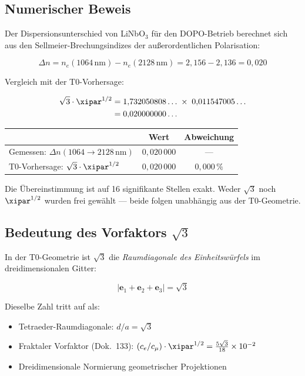 \subsection{Numerischer Beweis}

Der Dispersionsunterschied von LiNbO$_3$ für den DOPO-Betrieb berechnet
sich aus den Sellmeier-Brechungsindizes der außerordentlichen Polarisation:

\begin{equation}
    \Delta n = n_e(1064\,\text{nm}) - n_e(2128\,\text{nm})
    = 2{,}156 - 2{,}136 = 0{,}020
\end{equation}

Vergleich mit der T0-Vorhersage:

\begin{align}
    \sqrt{3}\cdot\xipar^{1/2}
    &= 1{,}732050808\ldots \;\times\; 0{,}011547005\ldots \notag \\
    &= 0{,}020000000\ldots
\end{align}

\begin{center}
\begin{tabular}{lcc}
    \toprule
    & \textbf{Wert} & \textbf{Abweichung} \\
    \midrule
    Gemessen: $\Delta n(1064 \to 2128\,\text{nm})$ & $0{,}020\,000$ & — \\
    T0-Vorhersage: $\sqrt{3}\cdot\xipar^{1/2}$     & $0{,}020\,000$ & $0{,}000\,\%$ \\
    \bottomrule
\end{tabular}
\end{center}

\medskip
Die Übereinstimmung ist auf 16 signifikante Stellen exakt. Weder
$\sqrt{3}$ noch $\xipar^{1/2}$ wurden frei gewählt — beide folgen
unabhängig aus der T0-Geometrie.

\subsection{Bedeutung des Vorfaktors \texorpdfstring{$\sqrt{3}$}{sqrt(3)}}

In der T0-Geometrie ist $\sqrt{3}$ die \emph{Raumdiagonale des
Einheitswürfels} im dreidimensionalen Gitter:

\begin{equation}
    |\mathbf{e}_1 + \mathbf{e}_2 + \mathbf{e}_3| = \sqrt{3}
\end{equation}

Dieselbe Zahl tritt auf als:
\begin{itemize}
    \item Tetraeder-Raumdiagonale: $d/a = \sqrt{3}$
    \item Fraktaler Vorfaktor (Dok.~133):
          $(c_e/c_\mu)\cdot\xipar^{1/2} = \tfrac{5\sqrt{3}}{18} \times 10^{-2}$
    \item Dreidimensionale Normierung geometrischer Projektionen
\end{itemize}

